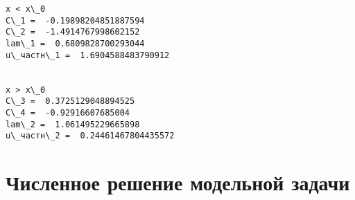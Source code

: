 \documentclass[11pt]{article}
\begin{document}
    \begin{Verbatim}[commandchars=\\\{\}]
x < x\_0
C\_1 =  -0.19898204851887594
C\_2 =  -1.4914767998602152
lam\_1 =  0.6809828700293044
u\_частн\_1 =  1.6904588483790912


x > x\_0
C\_3 =  0.3725129048894525
C\_4 =  -0.92916607685004
lam\_2 =  1.061495229665898
u\_частн\_2 =  0.24461467804435572
    \end{Verbatim}

    \hypertarget{ux447ux438ux441ux43bux435ux43dux43dux43eux435-ux440ux435ux448ux435ux43dux438ux435-ux43cux43eux434ux435ux43bux44cux43dux43eux439-ux437ux430ux434ux430ux447ux438}{%
\section{Численное решение модельной
задачи}\label{ux447ux438ux441ux43bux435ux43dux43dux43eux435-ux440ux435ux448ux435ux43dux438ux435-ux43cux43eux434ux435ux43bux44cux43dux43eux439-ux437ux430ux434ux430ux447ux438}}
\end{document}
